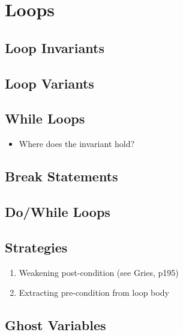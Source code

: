 \section{Loops}

\subsection{Loop Invariants}
\subsection{Loop Variants}
\subsection{While Loops}
\begin{itemize}
\item Where does the invariant hold?
\end{itemize}
\subsection{Break Statements}
\subsection{Do/While Loops}
\subsection{Strategies}
\begin{enumerate}
\item Weakening post-condition (see Gries, p195)
\item Extracting pre-condition from loop body
\end{enumerate}
\subsection{Ghost Variables}